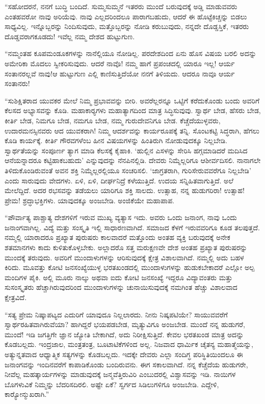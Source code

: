  “ಸಹೋದರನೆ, ನನಗೆ ಬುದ್ಧಿ ಬಂದಿದೆ. ಸುಮ್ಮಸುಮ್ಮನೆ ಇತರರು ಮುಂದೆ ಬರುವುದಕ್ಕೆ ಅಡ್ಡಿ ಮಾಡುವವರು ಎಂತಹವರೋ ನಾವು ಅರಿಯೆವು. ನಾವು ಎಲ್ಲದರಿಂದಲೂ ಪಾರಾಗಬಹುದು, ಆದರೆ ಈ ಹೊಟ್ಟೆಕಿಚ್ಚನ್ನು ಬಿಡಲು ಸಾಧ್ಯವಿಲ್ಲ. ಇನ್ನೊಬ್ಬರನ್ನು ನಿಂದಿಸುವುದು, ಮತ್ತೊಬ್ಬರನ್ನು ನೋಡಿ ಕರುಬುವುದು, ನನ್ನದೇ ದೊಡ್ಡಸ್ತಿಕೆ, ಇತರರು ದೊಡ್ಡವರಾಗಕೂಡದು! ಇವೆಲ್ಲ ನಮ್ಮ ದೇಶದ ಹುಟ್ಟುಗುಣ.

 “ನಮ್ಮಂತಹ ಕೂಪಮಂಡೂಕಗಳನ್ನು ನಾನೆಲ್ಲಿಯೂ ನೋಡಿಲ್ಲ. ಪರದೇಶದಿಂದ ಏನು ಹೊಸ ವಿಷಯ ಬರಲಿ ಅದನ್ನು ಅಮೇರಿಕಾ ಮೊದಲು ಸ್ವೀಕರಿಸುವುದು. ಆದರೆ ನಾವೊ! ನಮ್ಮ ಹಾಗೆ ಪ್ರಪಂಚದಲ್ಲಿ ಯಾರೂ ಇಲ್ಲ! ಆರ್ಯ ಸಂತಾನರಲ್ಲವೆ ನಾವು!‌ಆ ಹುಟ್ಟುಗುಣ ಎಲ್ಲಿ ಕಾಣಿಸುತ್ತಿದೆಯೋ ನನಗೆ ತಿಳಿಯದು. ಆದರೂ ನಾವೂ ಆರ್ಯ ಸಂತಾನರು!

 “ಸುಶಿಕ್ಷಿತರಾದ ಯುವಕರ ಮೇಲೆ ನಿಮ್ಮ ಪ್ರಭಾವವನ್ನು ಬೀರಿ. ಅವರೆಲ್ಲರನ್ನೂ ಒಟ್ಟಿಗೆ ಕರೆದುಕೊಂಡು ಬಂದು ಅವರಿಗೆ ಕೆಲಸದ ಅಭ್ಯಾಸವನ್ನು ಕೊಡಿ. ಮಹಾಕಾರ‍್ಯಗಳು ಮಹಾತ್ಯಾಗದಿಂದ ಮಾತ್ರ ಸಿದ್ಧಿಸುವುವು. ಸ್ವಾರ್ಥ ಬೇಡ, ಹೆಸರು ಬೇಡ, ಕೀರ್ತಿ ಬೇಡ, ನಿಮಗೂ ಬೇಡ, ನಮಗೂ ಬೇಡ, ನಮ್ಮ ಗುರುದೇವನಿಗೂ ಬೇಡ. ಕೆಚ್ಚೆದೆಯುಳ್ಳವರು, ಉದಾರಮನಸ್ಸಿನವರು ಆದ ಯುವಕರಾಗಿ! ನಿಮ್ಮ ಆದರ್ಶವನ್ನು ಕಾರ್ಯರೂಪಕ್ಕೆ ತನ್ನಿ. ಸೊಂಟಕಟ್ಟಿ ಸಿದ್ಧರಾಗಿ, ಹೆಗಲು ಕೊಡಿ ಕಾರ್ಯಕ್ಕೆ. ಕೀರ್ತಿ ಗೌರವಗಳೆಂಬ ಹೀನ ವಿಷಯಗಳನ್ನು ಹಿಂತಿರುಗಿ ನೋಡುವುದಕ್ಕೂ ನಿಲ್ಲಬೇಡಿ. ಸ್ವಾರ್ಥತೆಯನ್ನು ಸಂಪೂರ್ಣ ತ್ಯಾಗ ಮಾಡಿ ಕೆಲಸಕ್ಕೆ ಕೈಹಾಕಿ. ‘ಹುಲ್ಲಿನ ಎಸಳನ್ನು ಸೇರಿಸಿ ಹಗ್ಗಮಾಡಿದರೆ ಮದಿಸಿದ ಆನೆಯನ್ನಾದರೂ ಕಟ್ಟಿಹಾಕಬಹುದು’ ಎನ್ನುವುದನ್ನು ನೆನಪಿನಲ್ಲಿಡಿ. ದೇವರು ನಿಮ್ಮೆಲ್ಲರಿಗೂ ಆಶೀರ್ವದಿಸಲಿ. ನಾನಾಗಲೇ ತಿಳಿದುಕೊಂಡಿರುವಂತೆ ಅವನ ಶಕ್ತಿ ನಿಮ್ಮೆಲ್ಲರಲ್ಲಿಯೂ ಸಂಚರಿಸಲಿ. ‘ಜಾಗ್ರತರಾಗಿ, ಗುರಿಸೇರುವವರೆಗೂ ನಿಲ್ಲಬೇಡಿ’ ಎಂದು ಸಾರುವುದು ವೇದಗಳು. ಏಳಿ, ಏಳಿ, ದೀರ್ಘನಿದ್ರೆ ಕಳೆಯುತ್ತಿದೆ. ಉದಯ ಸನ್ನಿಹಿತವಾಗುತ್ತಿದೆ. ಅಲೆ ಮೇಲೆದ್ದಿದೆ. ಅದರ ರಭಸವನ್ನು ತಡೆಯಲು ಯಾರಿಗೂ ಶಕ್ತಿ ಸಾಲದು. ಉತ್ಸಾಹ, ನನ್ನ ಹುಡುಗರಿರಾ! ಉತ್ಸಾಹ! ಪ್ರೇಮ! ಶ್ರದ್ಧಾಭಕ್ತಿಗಳು. ಯಾವುದಕ್ಕೂ ಅಂಜಬೇಡಿ. ಅಂಜಿಕೆಯೇ ಮಹಾಪಾಪ.

 “ಪೌರ್ವಾತ್ಯ ಪಾಶ್ಚಾತ್ಯ ದೇಶಗಳಿಗೆ ಇರುವ ಮುಖ್ಯ ವ್ಯತ್ಯಾಸ ಇದು. ಅವರು ಒಂದು ಜನಾಂಗ, ನಾವು ಒಂದು ಜನಾಂಗವಾಗಿಲ್ಲ. ವಿದ್ಯೆ ಮತ್ತು ಸಂಸ್ಕೃತಿ ಇಲ್ಲಿ ಸಾಧಾರಣವಾಗಿದೆ. ಸಮಾಜದ ಕೆಳಗೆ ಇರುವವರಿಗೂ ಕೂಡ ತಲಪುತ್ತದೆ. ನಮ್ಮಲ್ಲಿ ಯಾರಾದರೂ ಪ್ರಖ್ಯಾತ ಪುರುಷರು ಕಾಲವಾದರೆ ಮತ್ತೊಂದು ಅಂತಹ ವ್ಯಕ್ತಿ ಬರುವುದಕ್ಕೆ ಅನೇಕ ಶತಮಾನಗಳು ಕಾದು ಕುಳಿತುಕೊಳ್ಳಬೇಕು. ಅಲ್ಲಾದರೊ ಸತ್ತ ಮರುಕ್ಷಣವೇ ದೇಶ ಅಂತಹ ಪ್ರಖ್ಯಾತ ಪುರುಷರನ್ನು ಮುಂದಕ್ಕೆ ತರುವುದು. ಅವರಿಗೆ ಮುಂದಾಳುಗಳನ್ನು ಆರಿಸುವುದಕ್ಕೆ ಕ್ಷೇತ್ರ ವಿಶಾಲವಾಗಿದೆ. ನಮ್ಮಲ್ಲಿ ಅದು ಬಹಳ ಕಿರಿದು. ಮೂವತ್ತು ಕೋಟಿ ಜನಸಂಖ್ಯೆಯುಳ್ಳ ಭರತಖಂಡದಲ್ಲಿ ಮುಂದಾಳುಗಳನ್ನು ಹುಡುಕಬೇಕಾದರೆ ಎಲ್ಲೋ ಅಲ್ಪ ಮಂದಿಗಳ ಪೈಕಿ. ಅಲ್ಲಿ ಮೂರು ನಾಲ್ಕು ಅಥವಾ ಐದು ಕೋಟಿ ಜನಸಂಖ್ಯೆ ಇದ್ದರೂ ವಿದ್ಯಾವಂತರು ಮತ್ತು ಸುಸಂಸ್ಕೃತರು ಹೆಚ್ಚಾಗಿರುವುದರಿಂದ ಮುಂದಾಳುಗಳನ್ನು ಚುನಾಯಿಸುವುದಕ್ಕೆ ನಮಗಿಂತ ಹೆಚ್ಚು ವಿಶಾಲವಾದ ಕ್ಷೇತ್ರವಿದೆ.

 “ಸತ್ಯ ಪ್ರೇಮ ನಿಷ್ಕಾಪಟ್ಯದ ಎದುರಿಗೆ ಯಾವುದೂ ನಿಲ್ಲಲಾರದು. ನೀನು ನಿಷ್ಕಪಟಿಯೇ? ಸಾಯುವವರೆಗೆ ಸ್ವಾರ್ಥರಹಿತವಾಗಿರುವೆಯಾ? ಹಾಗಿದ್ದರೆ ಭಯಪಡಬೇಡ, ಮೃತ್ಯುವಿಗೂ ಅಂಜಬೇಡ. ಮುಂದೆ ನನ್ನ ಹುಡುಗರೆ, ಮುಂದೆ! ಇಡಿ ಜಗತ್ತಿಗೇ ಜ್ಞಾನ ಜ್ಯೋತಿ ಬೇಕಾಗಿದೆ, ಅದು ನಿರೀಕ್ಷಿಸುತ್ತಿದೆ. ಕೇವಲ ಭರತಖಂಡ ಮಾತ್ರ ಅದನ್ನು ಕೊಡಬಲ್ಲದು. ಇಂದ್ರಜಾಲ, ಮಂತ್ರತಂತ್ರ, ಬೂಟಾಟಿಕೆಗಳಿಂದ ಅಲ್ಲ. ನಿಜವಾದ ಧಾರ್ಮಿಕ ಚೈತನ್ಯ ಮಹಾತ್ಮೆಯನ್ನು, ಅತ್ಯುನ್ನತವಾದ ಆಧ್ಯಾತ್ಮಿಕ ಸತ್ಯಗಳನ್ನು ಕೊಡಬಲ್ಲದು. ಇದಕ್ಕೇ ದೇವರು ಎಲ್ಲಾ ಸಂದಿಗ್ಧ ಪರಿಸ್ಥಿತಿಯಿಂದಲೂ ಈ ಜನಾಂಗವನ್ನು ಇಂದಿನವರೆಗೆ ಕಾಪಾಡಿಕೊಂಡು ಬಂದಿರುವನು. ಈಗ ಸಕಾಲವಾಗಿದೆ. ನನ್ನ ಕೆಚ್ಚೆದೆಯ ಹುಡುಗರೇ, ನೀವೆಲ್ಲ ಮಹತ್ಕಾರ್ಯಗಳನ್ನು ಮಾಡುವುದಕ್ಕೆ ಜನ್ಮವೆತ್ತಿರುವಿರಿ ಎಂಬುದರಲ್ಲಿ ವಿಶ್ವಾಸವನ್ನು ಇಡಿ. ನಾಯಿಗಳ ಬೊಗಳುವಿಕೆ ನಿಮ್ಮನ್ನು ಬೆದರಿಸದಿರಲಿ. ಅಷ್ಟೇ ಏಕೆ? ಸ್ವರ್ಗದ ಸಿಡಿಲುಗಳಿಗೂ ಅಂಜಬೇಡಿ. ಎದ್ದೇಳಿ, ಕಾರ‍್ಯೋನ್ಮುಖರಾಗಿ.” 

